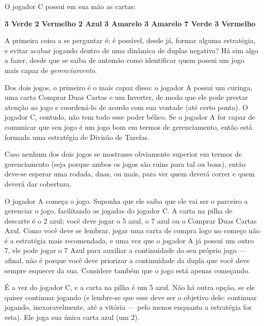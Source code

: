 \vspace{0.5cm}

O jogador C possui em sua mão as cartas:

\vspace{0.5cm}

\textbf{3 Verde \hspace{1cm} 2 Vermelho \hspace{1cm} 2 Azul \hspace{1cm} 3 Amarelo \hspace{1cm} 3 Amarelo \hspace{1cm} 7 Verde \hspace{1cm} 3 Vermelho}

\vspace{0.5cm}

A primeira coisa a se perguntar é: é possível, desde já, formar alguma estratégia, e evitar acabar jogando dentro de uma dinâmica de duplas negativa? Há sim algo a fazer, desde que se saiba de antemão como identificar quem possui um jogo mais capaz de \emph{gerenciamento}.

Dos dois jogos, o primeiro é o mais capaz disso: o jogador A possui um curinga, uma carta Comprar Duas Cartas e um Inverter, de modo que ele pode prestar atenção ao jogo e coordená-lo de acordo com sua vontade (até certo ponto). O jogador C, contudo, não tem todo esse poder bélico. Se o jogador A for capaz de comunicar que seu jogo é um jogo bom em termos de gerenciamento, então está formada uma estratégia de Divisão de Tarefas.

Caso nenhum dos dois jogos se mostrasse obviamente superior em termos de gerenciamento (seja porque ambos os jogos são ruins para tal ou bons), então deve-se esperar uma rodada, duas, ou mais, para ver quem deverá correr e quem deverá dar cobertura.

O jogador A começa o jogo. Suponha que ele saiba que ele vai ser o parceiro a gerenciar o jogo, facilitando as jogadas do jogador C. A carta na pilha de descarte é o 2 azul; você deve jogar o 5 azul, o 7 azul ou o Comprar Duas Cartas Azul. Como você deve se lembrar, jogar uma carta de compra logo no começo não é a estratégia mais recomendada, e uma vez que o jogador A já possui um outro 7, ele pode jogar o 7 Azul para auxiliar a continuidade do seu próprio jogo --- afinal, não é porque você deve priorizar a continuidade da dupla que você deve sempre esquecer da sua. Considere também que o jogo está apenas começando.

É a vez do jogador C, e a carta na pilha é um 5 azul. Não há outra opção, se ele quiser continuar jogando (e lembre-se que esse deve ser o objetivo dele: continuar jogando, inexoravelmente, até a vitória --- pelo menos enquanto a estratégia for esta). Ele joga sua única carta azul (um 2).

